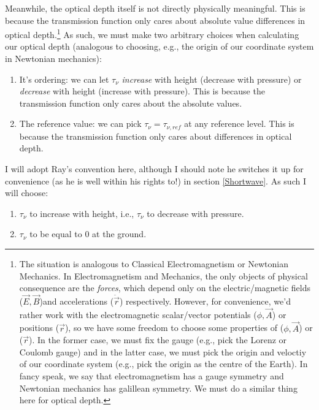 Meanwhile, the optical depth itself is not directly physically meaningful. This is because the transmission function only cares about absolute value differences in optical depth.\footnote{
    The situation is analogous to Classical Electromagnetism or Newtonian Mechanics. In Electromagnetism and Mechanics, the only objects of physical consequence are the \textit{forces}, which depend only on the electric/magnetic fields ($\vec{E},\vec{B}$)\footnotemark and accelerations ($\ddot{\vec{r}}$) respectively. However, for convenience, we'd rather work with the electromagnetic scalar/vector potentials ($\phi,\vec{A}$) or  positions ($\vec{r}$), so we have some freedom to choose some properties of ($\phi,\vec{A}$) or ($\vec{r}$). In the former case, we must fix the gauge (e.g., pick the Lorenz or Coulomb gauge) and in the latter case, we must pick the origin and veloctiy of our coordinate system (e.g., pick the origin as the centre of the Earth). In fancy speak, we say that electromagnetism has a gauge symmetry and Newtonian mechanics has galillean symmetry. We must do a similar thing here for optical depth.
}
As such, we must make two arbitrary choices when calculating our optical depth (analogous to choosing, e.g., the origin of our coordinate system in Newtonian mechanics):
\begin{enumerate}
    \item It's ordering: we can let $\tau_\nu$ \textit{increase} with height (decrease with pressure) or \textit{decrease} with height (increase with pressure). This is because the transmission function only cares about the absolute values.
    \item The reference value: we can pick $\tau_\nu=\tau_{\nu,ref}$ at any reference level. This is because the transmission function only cares about differences in optical depth.
\end{enumerate}
I will adopt Ray's convention here, although I should note he switches it up for convenience (as he is well within his rights to!) in section \ref{Shortwave}. As such I will choose:
\begin{enumerate}
    \item $\tau_\nu$ to increase with height, i.e., $\tau_\nu$ to decrease with pressure.
    \item $\tau_\nu$ to be equal to $0$ at the ground.
\end{enumerate}

